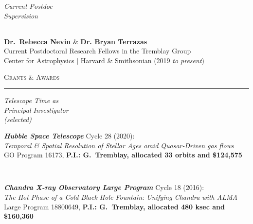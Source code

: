 \documentclass[11pt]{article}
\makeatletter
\def\vhrulefill#1{\leavevmode\leaders\hrule\@height#1\hfill \kern\z@}
\makeatother
\begin{document}
\vspace{2mm}






\hspace{2.5mm} \parbox{1.5in}{\textit{Current Postdoc \\Supervision \\\\}} \parbox{5.15in}{\textbf{Dr.~Rebecca Nevin} \& \textbf{Dr. Bryan Terrazas} \\ Current Postdoctoral Research Fellows in the Tremblay Group \\
Center for Astrophysics $|$ Harvard \& Smithsonian (2019 \textit{to present})\\

}



\textsc{Grants \& Awards} \vhrulefill{0.4pt}

\vspace{4mm}


\hspace{2.5mm} \parbox{1.5in}{\textit{Telescope Time as \\ Principal Investigator \\ (selected) }} \parbox{5.15in}{\textbf{\textit{Hubble Space Telescope}} Cycle 28 (2020):\\ \textit{Temporal \& Spatial Resolution of Stellar Ages amid Quasar-Driven gas flows} \\ GO Program 16173, \textbf{P.I.: G.~Tremblay, allocated 33 orbits and \$124,575}} \\


\vspace{4mm}

\hspace{42mm} \parbox{5.15in}{\textbf{\textit{Chandra X-ray Observatory Large Program}} Cycle 18 (2016):\\ \textit{The Hot Phase of a Cold Black Hole Fountain: Unifying Chandra with ALMA} \\ Large Program 18800649, \textbf{P.I.: G.~Tremblay, allocated 480 ksec and \$160,360} }\\
\end{document}
